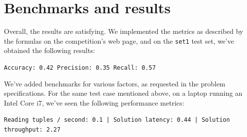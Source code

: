 \documentclass{article}
\begin{document}
	\pagebreak
	
	\section{Benchmarks and results}
	
	Overall, the results are satisfying. We implemented the metrics as described by the formulas on the competition's web page, and on the \texttt{set1} test set, we've obtained the following results:
	
	\begin{center}
		\texttt{Accuracy: 0.42 Precision: 0.35 Recall: 0.57}
	\end{center}
	
	We've added benchmarks for various factors, as requested in the problem specifications. For the same test case mentioned above, on a laptop running an Intel Core i7, we've seen the following performance metrics:
	
	\begin{center}
		\texttt{Reading tuples / second: 0.1 | Solution latency: 0.44 | Solution throughput: 2.27}
	\end{center} 
	
\end{document}
